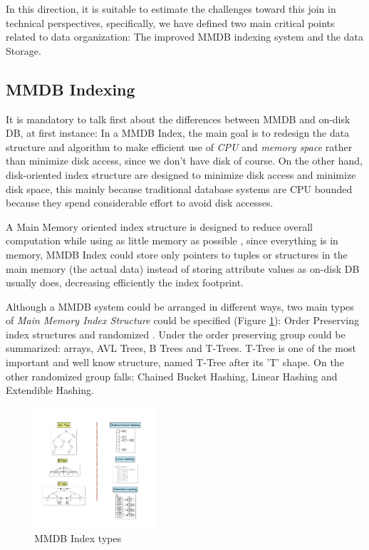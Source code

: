 \documentclass[10pt]{article} %
\begin{document}
    In this direction, it is suitable to estimate the challenges toward this join in technical perspectives, specifically, we have defined two main critical points related to data organization: The improved MMDB indexing system and the data Storage.

    
\subsection{MMDB Indexing}
It is mandatory to talk first about the differences between MMDB and on-disk DB, at first instance: In a MMDB Index, the main goal is to redesign the data structure and algorithm to make efficient use of \emph{ CPU } and \emph{ memory space } rather than minimize disk access, since we don't have disk of course. On the other hand, disk-oriented index structure are designed to minimize disk access and minimize disk space, this mainly because traditional database systems are CPU bounded because they spend considerable effort to avoid disk accesses.

A Main Memory oriented index structure is designed to reduce overall computation while using as little memory as possible \cite{lehman1986study}, since everything is in memory, MMDB Index could store only pointers to tuples or structures in the main memory (the actual data) instead of storing attribute values as on-disk DB usually does, decreasing efficiently the index footprint.

Although a MMDB system could be arranged in different ways, two main types of \emph{ Main Memory Index Structure } could be specified (Figure \ref{fig:fig6}): Order Preserving index structures and randomized \cite{lehman1986study}. Under the order preserving group could be summarized: arrays, AVL Trees, B Trees and T-Trees. T-Tree is one of the most important and well know structure, named T-Tree after its 'T' shape. On the other randomized group falls: Chained Bucket Hashing, Linear Hashing and Extendible Hashing.

\begin{figure}
  \vspace{-20pt}
    \centering
    \includegraphics[width=0.4\textwidth]{./pictures/fig6}
  \caption{MMDB Index types}
  \label{fig:fig6}
  \vspace{-20pt}
\end{figure}
\end{document}

